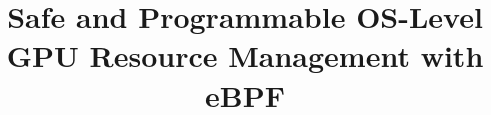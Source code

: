 \documentclass[sigplan,screen,pbalance]{acmart}
\title{Safe and Programmable OS-Level GPU Resource Management with eBPF}
\newcommand{\sys}{gpu\_ext\xspace}
\begin{document}

%


\end{document}
